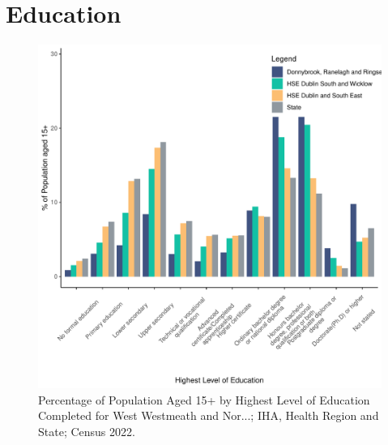 \documentclass{article}
\begin{document}
\section{Education}\label{sect:Edu}
\begin{figure}[H]
	\centering
	\includegraphics[width = 120mm]{../figures/EduED.pdf}
	\caption{Percentage of Population Aged 15+ by Highest Level of Education Completed for West Westmeath and Nor...; IHA, Health Region and State; Census 2022.}
	\label{fig:vbnv}
	\end{figure}
\end{document}
